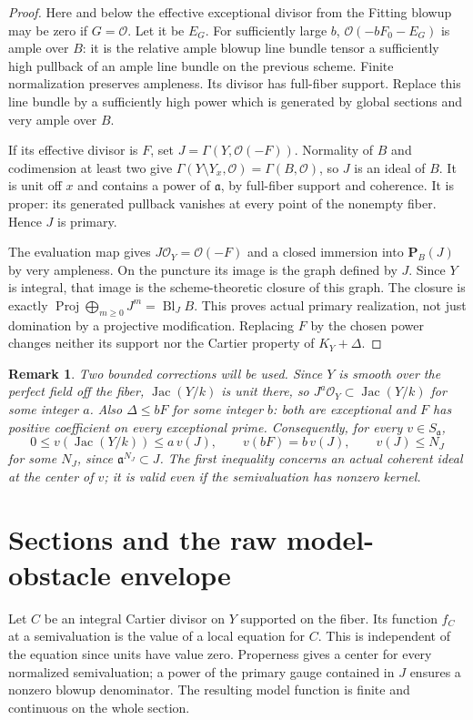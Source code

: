 \documentclass[11pt]{article}
\newtheorem{remark}[theorem]{Remark}
\newcommand{\OO}{\mathcal O}
\newcommand{\Jac}{\operatorname{Jac}}
\newcommand{\Bl}{\operatorname{Bl}}
\begin{document}
\begin{proof}
Here and below the effective exceptional divisor from the Fitting blowup
may be zero if $G=\OO$. Let it be $E_G$. For sufficiently large $b$,
$\OO(-bF_0-E_G)$ is ample over $B$: it is the relative ample blowup line
bundle tensor a sufficiently high pullback of an ample line bundle on the
previous scheme. Finite normalization preserves ampleness. Its divisor has
full-fiber support. Replace this line bundle by a sufficiently high power
which is generated by global sections and very ample over $B$.

If its effective divisor is $F$, set $J=\Gamma(Y,\OO(-F))$. Normality of
$B$ and codimension at least two give
$\Gamma(Y\setminus Y_x,\OO)=\Gamma(B,\OO)$, so $J$ is an ideal of $B$.
It is unit off $x$ and contains a power of $\mathfrak a$, by full-fiber
support and coherence. It is proper: its generated pullback vanishes at
every point of the nonempty fiber. Hence $J$ is primary.

The evaluation map gives $J\OO_Y=\OO(-F)$ and a closed immersion into
$\mathbf P_B(J)$ by very ampleness. On the puncture its image is the graph
defined by $J$. Since $Y$ is integral, that image is the scheme-theoretic
closure of this graph. The closure is exactly $\operatorname{Proj}
\bigoplus_{m\geq0}J^m=\Bl_J B$. This proves actual primary realization,
not just domination by a projective modification. Replacing $F$ by the
chosen power changes neither its support nor the Cartier property of
$K_Y+\Delta$.
\end{proof}

\begin{remark}
Two bounded corrections will be used. Since $Y$ is smooth over the perfect
field off the fiber, $\Jac(Y/k)$ is unit there, so
$J^a\OO_Y\subset\Jac(Y/k)$ for some integer $a$.
Also $\Delta\leq bF$ for some integer $b$: both are exceptional and
$F$ has positive coefficient on every exceptional prime. Consequently, for
every $v\in S_{\mathfrak a}$,
\[
 0\leq v(\Jac(Y/k))\leq a\,v(J),\qquad
 v(bF)=b\,v(J),\qquad v(J)\leq N_J
\]
for some $N_J$, since $\mathfrak a^{N_J}\subset J$.
The first inequality concerns an actual coherent ideal at the center of $v$;
it is valid even if the semivaluation has nonzero kernel.
\end{remark}

\section{Sections and the raw model-obstacle envelope}
Let $C$ be an integral Cartier divisor on $Y$ supported on the fiber. Its
function $f_C$ at a semivaluation is the value of a local equation for $C$.
This is independent of the equation since units have value zero. Properness
gives a center for every normalized semivaluation; a power of the primary
gauge contained in $J$ ensures a nonzero blowup denominator. The resulting
model function is finite and continuous on the whole section.
\end{document}
